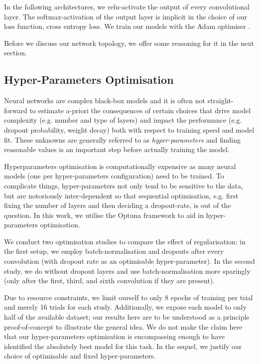 \documentclass[british,12p]{article}
\begin{document}
    In the following architectures, we relu-activate the output of every convolutional layer. The softmax-activation of the output layer is implicit in the choice of our loss function, cross entropy loss. 
    We train our models with the Adam optimiser \cite{kingma:15}.  
    
    Before we discuss our network topology, we offer some reasoning for it in the next section.

 	
    \subsection{Hyper-Parameters Optimisation}
    
    Neural networks are complex black-box models and it is often not straight-forward to estimate a-priori the consequences of certain choices that drive model complexity (e.g. number and type of layers) and impact the performance (e.g. dropout probability, weight decay) both with respect to training speed and model fit. These unknowns are generally referred to as \textit{hyper-parameters} and finding reasonable values is an important step before actually training the model.
    
    Hyperparameters optimisation is computationally expensive as many neural models (one per hyper-parameters configuration) need to be trained. To complicate things, hyper-parameters not only tend to be sensitive to the data, but are notoriously inter-dependent so that sequential optimisation, e.g. first fixing the number of layers and then deciding a dropout-rate, is out of the question. In this work, we utilise the Optuna framework \cite{optuna:19} to aid in hyper-parameters optimisation. 
    
    We conduct two optimisation studies to compare the effect of regularisation: in the first setup, we employ batch-normalisation and dropouts after every convolution (with dropout rate as an optimisable hyper-parameter). In the second study, we do without dropout layers and use batch-normalisation more sparingly (only after the first, third, and sixth convolution if they are present).  
    
    Due to resource constraints, we limit ourself to only 8 epochs of training per trial and merely 16 trials for each study. Additionally, we expose each model to only half of the available dataset; our results here are to be understood as a principle proof-of-concept to illustrate the general idea. We do not make the claim here that our hyper-parameters optimisation is encompassing enough to have identified the absolutely best model for this task. In the sequel, we justify our choice of optimisable and fixed hyper-parameters.
   
\end{document}

